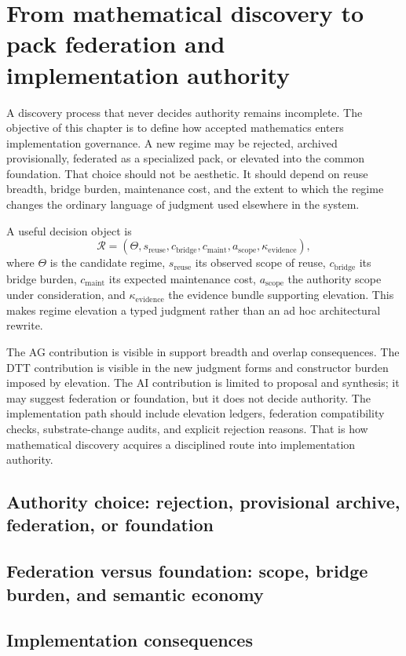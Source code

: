 \documentclass[11pt]{report}
\begin{document}
\chapter{From mathematical discovery to pack federation and implementation authority}
A discovery process that never decides authority remains incomplete. The objective of this chapter is to define how accepted mathematics enters implementation governance. A new regime may be rejected, archived provisionally, federated as a specialized pack, or elevated into the common foundation. That choice should not be aesthetic. It should depend on reuse breadth, bridge burden, maintenance cost, and the extent to which the regime changes the ordinary language of judgment used elsewhere in the system.

A useful decision object is
\[
\mathcal{R} = (\Theta, s_{\mathrm{reuse}}, c_{\mathrm{bridge}}, c_{\mathrm{maint}}, a_{\mathrm{scope}}, \kappa_{\mathrm{evidence}}),
\]
where $\Theta$ is the candidate regime, $s_{\mathrm{reuse}}$ its observed scope of reuse, $c_{\mathrm{bridge}}$ its bridge burden, $c_{\mathrm{maint}}$ its expected maintenance cost, $a_{\mathrm{scope}}$ the authority scope under consideration, and $\kappa_{\mathrm{evidence}}$ the evidence bundle supporting elevation. This makes regime elevation a typed judgment rather than an ad hoc architectural rewrite.

The AG contribution is visible in support breadth and overlap consequences. The DTT contribution is visible in the new judgment forms and constructor burden imposed by elevation. The AI contribution is limited to proposal and synthesis; it may suggest federation or foundation, but it does not decide authority. The implementation path should include elevation ledgers, federation compatibility checks, substrate-change audits, and explicit rejection reasons. That is how mathematical discovery acquires a disciplined route into implementation authority.
\section{Authority choice: rejection, provisional archive, federation, or foundation}
\section{Federation versus foundation: scope, bridge burden, and semantic economy}
\section{Implementation consequences}
\end{document}

